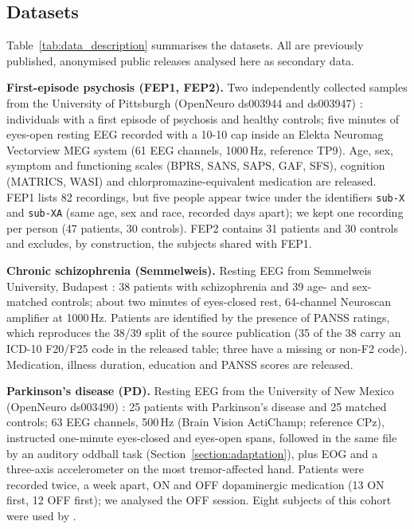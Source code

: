 \documentclass[pdflatex,referee,sn-basic]{sn-jnl}%
\begin{document}
\subsection{Datasets}\label{materials:data}

Table~\ref{tab:data_description} summarises the datasets. All are previously published, anonymised public releases analysed here as secondary data.

\noindent\textbf{First-episode psychosis (FEP1, FEP2).} Two independently collected samples from the University of Pittsburgh (OpenNeuro ds003944 and ds003947) \cite{salisbury_ds003944,salisbury_ds003947}: individuals with a first episode of psychosis and healthy controls; five minutes of eyes-open resting EEG recorded with a 10-10 cap inside an Elekta Neuromag Vectorview MEG system (61 EEG channels, 1000\,Hz, reference TP9). Age, sex, symptom and functioning scales (BPRS, SANS, SAPS, GAF, SFS), cognition (MATRICS, WASI) and chlorpromazine-equivalent medication are released. FEP1 lists 82 recordings, but five people appear twice under the identifiers \texttt{sub-X} and \texttt{sub-XA} (same age, sex and race, recorded days apart); we kept one recording per person (47 patients, 30 controls). FEP2 contains 31 patients and 30 controls and excludes, by construction, the subjects shared with FEP1.

\noindent\textbf{Chronic schizophrenia (Semmelweis).} Resting EEG from Semmelweis University, Budapest \cite{racz2025}: 38 patients with schizophrenia and 39 age- and sex-matched controls; about two minutes of eyes-closed rest, 64-channel Neuroscan amplifier at 1000\,Hz. Patients are identified by the presence of PANSS ratings, which reproduces the 38/39 split of the source publication (35 of the 38 carry an ICD-10 F20/F25 code in the released table; three have a missing or non-F2 code). Medication, illness duration, education and PANSS scores are released.

\noindent\textbf{Parkinson's disease (PD).} Resting EEG from the University of New Mexico (OpenNeuro ds003490) \cite{cavanagh_ds003490}: 25 patients with Parkinson's disease and 25 matched controls; 63 EEG channels, 500\,Hz (Brain Vision ActiChamp; reference CPz), instructed one-minute eyes-closed and eyes-open spans, followed in the same file by an auditory oddball task (Section~\ref{section:adaptation}), plus EOG and a three-axis accelerometer on the most tremor-affected hand. Patients were recorded twice, a week apart, ON and OFF dopaminergic medication (13 ON first, 12 OFF first); we analysed the OFF session. Eight subjects of this cohort were used by \cite{yao2025catd}.
\end{document}
